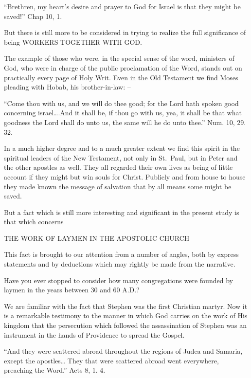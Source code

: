 \documentclass[
]{book}
\begin{document}
``Brethren, my heart's desire and prayer to God for Israel is that they might be saved!'' Chap 10, 1.

But there is still more to be considered in trying to realize the full significance of being WORKERS TOGETHER WITH GOD.

The example of those who were, in the special sense of the word, ministers of God, who were in charge of the public proclamation of the Word, stands out on practically every page of Holy Writ. Even in the Old Testament we find Moses pleading with Hobab, his brother-in-law: --

``Come thou with us, and we will do thee good; for the Lord hath spoken good concerning israel\ldots.And it shall be, if thou go with us, yea, it shall be that what goodness the Lord shall do unto us, the same will he do unto thee.'' Num. 10, 29. 32.

In a much higher degree and to a much greater extent we find this spirit in the spiritual leaders of the New Testament, not only in St.~Paul, but in Peter and the other apostles as well. They all regarded their own lives as being of little account if they might but win souls for Christ. Publicly and from house to house they made known the message of salvation that by all means some might be saved.

But a fact which is still more interesting and significant in the present study is that which concerns

\begin{center} THE WORK OF LAYMEN IN THE APOSTOLIC CHURCH \end{center}

This fact is brought to our attention from a number of angles, both by express statements and by deductions which may rightly be made from the narrative.

Have you ever stopped to consider how many congregations were founded by laymen in the years between 30 and 60 A.D.?

We are familiar with the fact that Stephen was the first Christian martyr. Now it is a remarkable testimony to the manner in which God carries on the work of His kingdom that the persecution which followed the assassination of Stephen was an instrument in the hands of Providence to spread the Gospel.

``And they were scattered abroad throughout the regions of Judea and Samaria, except the apostles\ldots{} They that were scattered abroad went everywhere, preaching the Word.'' Acts 8, 1. 4.
\end{document}
